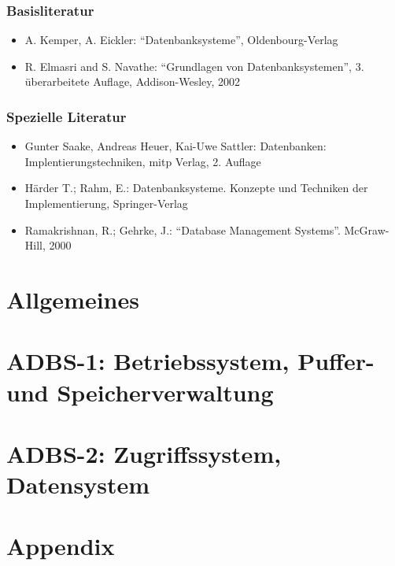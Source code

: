 \documentclass[10pt,german,a4paper]{scrreprt}
\def \Path {/media/Daten/Studium/Skripte/Datenbanken}
\theoremstyle{mytheoremstyle}
\begin{document}
\section{Basisliteratur}
\begin{itemize}
\item A. Kemper, A. Eickler: “Datenbanksysteme”, Oldenbourg-Verlag
\item R. Elmasri and S. Navathe: “Grundlagen von Datenbanksystemen”, 3. überarbeitete
Auflage, Addison-Wesley, 2002
\end{itemize}

\section{Spezielle Literatur}
\begin{itemize}
\item Gunter Saake, Andreas Heuer, Kai-Uwe Sattler: Datenbanken:
Implentierungstechniken, mitp Verlag, 2. Auflage

\item Härder T.; Rahm, E.: Datenbanksysteme. Konzepte und Techniken der
Implementierung, Springer-Verlag
\item Ramakrishnan, R.; Gehrke, J.: “Database Management Systems”. McGraw-Hill, 2000

\end{itemize}

\newpage
\part{Allgemeines}
\newpage


\part{ADBS-1: Betriebssystem, Puffer- und Speicherverwaltung}
\newpage



\part{ADBS-2: Zugriffssystem, Datensystem}
\newpage
%


\part{Appendix}
\newpage
%
\end{document}

